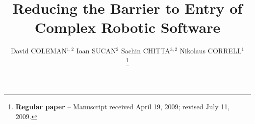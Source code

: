 \documentclass[10pt,journal,compsoc]{joser1}
\begin{document}
\title{Reducing the Barrier to Entry of \\\baselineskip Complex Robotic Software}

\author{
David COLEMAN$^{1,2}$
\qquad
Ioan SUCAN$^{2}$
\qquad
Sachin CHITTA$^{3,2}$
\qquad
Nikolaus CORRELL$^{1}$

\thanks{{\bf Regular paper} -- Manuscript received April 19, 2009;
revised July 11, 2009.}



} %

\address{
$^1$ Dept. of Computer Science, University of Colorado at Boulder, 430 UCB, Boulder, CO 80309\\
$^2$ Willow Garage, Inc., 68 Willow Road, Menlo Park, CA 94025\\
$^3$ SRI International, 333 Ravenswood Avenue, Menlo Park, CA 94025
}


\markboth
\end{document}
